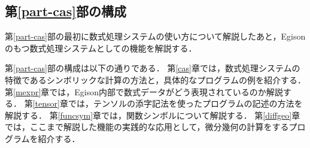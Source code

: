 
\subsection{第\ref{part-cas}部の構成}

第\ref{part-cas}部の最初に数式処理システムの使い方について解説したあと，Egisonのもつ数式処理システムとしての機能を解説する．

第\ref{part-cas}部の構成は以下の通りである．
第\ref{cas}章では，数式処理システムの特徴であるシンボリックな計算の方法と，具体的なプログラムの例を紹介する．
第\ref{mexpr}章では，Egison内部で数式データがどう表現されているのか解説する．
第\ref{tensor}章では，テンソルの添字記法を使ったプログラムの記述の方法を解説する．
第\ref{funcsym}章では，関数シンボルについて解説する．
第\ref{diffgeo}章では，ここまで解説した機能の実践的な応用として，微分幾何の計算をするプログラムを紹介する．

